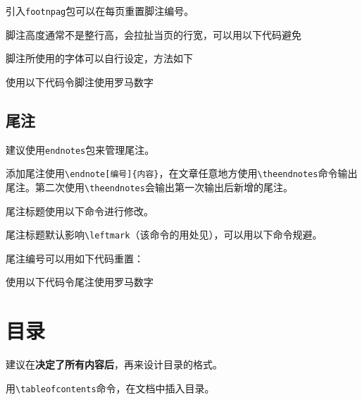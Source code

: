 \documentclass[10pt,openany]{book}
\begin{document}
\begin{sloppypar}
    引入\texttt{footnpag}包可以在每页重置脚注编号。

    

    脚注高度通常不是整行高，会拉扯当页的行宽，可以用以下代码避免

    

    脚注所使用的字体可以自行设定，方法如下

    

    使用以下代码令脚注使用罗马数字

    

    \section{尾注}

    建议使用\texttt{endnotes}包来管理尾注。

    添加尾注使用\texttt{\textbackslash{}endnote{[}编号{]}\{内容\}}，在文章任意地方使用\texttt{\textbackslash{}theendnotes}命令输出尾注。第二次使用\texttt{\textbackslash{}theendnotes}会输出第一次输出后新增的尾注。

    尾注标题使用以下命令进行修改。

    

    尾注标题默认影响\texttt{\textbackslash{}leftmark}（该命令的用处见\textit{}），可以用以下命令规避。

    

    尾注编号可以用如下代码重置：

    

    使用以下代码令尾注使用罗马数字

    

    \chapter{目录}

    建议在\textbf{决定了所有内容后}，再来设计目录的格式。

    用\texttt{\textbackslash{}tableofcontents}命令，在文档中插入目录。


\end{sloppypar}
\end{document}
